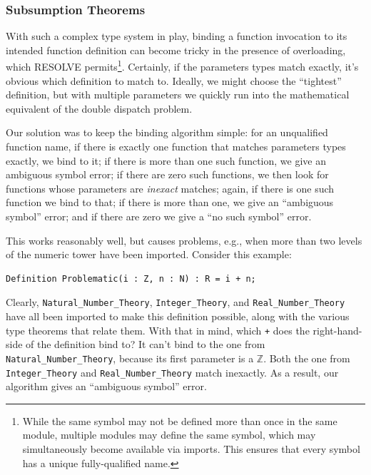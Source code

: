 		\subsubsection{Subsumption Theorems\label{subsumptionTheorems}}

With such a complex type system in play, binding a function invocation to its intended function definition can become tricky in the presence of overloading, which RESOLVE permits\footnote{While the same symbol may not be defined more than once in the same module, multiple modules may define the same symbol, which may simultaneously become available via imports.  This ensures that every symbol has a unique fully-qualified name.}.  Certainly, if the parameters types match exactly, it's obvious which definition to match to.  Ideally, we might choose the ``tightest'' definition, but with multiple parameters we quickly run into the mathematical equivalent of the double dispatch problem.

Our solution was to keep the binding algorithm simple: for an unqualified function name, if there is exactly one function that matches parameters types exactly, we bind to it; if there is more than one such function, we give an ambiguous symbol error; if there are zero such functions, we then look for functions whose parameters are \emph{inexact} matches; again, if there is one such function we bind to that; if there is more than one, we give an ``ambiguous symbol'' error; and if there are zero we give a ``no such symbol'' error.

This works reasonably well, but causes problems, e.g., when more than two levels of the numeric tower have been imported.  Consider this example:

\begin{lstlisting}
Definition Problematic(i : Z, n : N) : R = i + n;
\end{lstlisting}

Clearly, \texttt{Natural\_Number\_Theory}, \texttt{Integer\_Theory}, and \texttt{Real\_Number\_Theory} have all been imported to make this definition possible, along with the various type theorems that relate them.  With that in mind, which \texttt{+} does the right-hand-side of the definition bind to?  It can't bind to the one from \texttt{Natural\_Number\_Theory}, because its first parameter is a $\mathbb{Z}$.  Both the one from \texttt{Integer\_Theory} and \texttt{Real\_Number\_Theory} match inexactly.  As a result, our algorithm gives an ``ambiguous symbol'' error.

